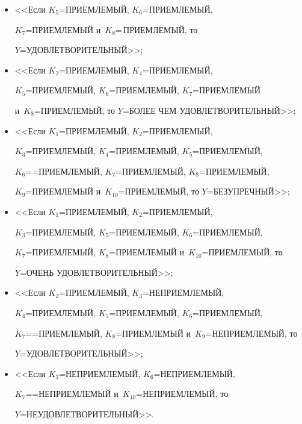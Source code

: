 \begin{itemize} 

\item[$e_1$:] <<Если $K_5$\;=\;ПРИ\-ЕМ\-ЛЕ\-МЫЙ, $K_6$\;=\;ПРИ\-ЕМ\-ЛЕ\-МЫЙ, 

$K_7$\;=\;ПРИ\-ЕМ\-ЛЕ\-МЫЙ и~$K_8$\;=\,ПРИ\-ЕМ\-ЛЕ\-МЫЙ, то 

$Y$\;=\;УДОВЛЕ\-ТВО\-РИ\-ТЕЛЬ\-НЫЙ>>; 

  

\item[$e_2$:] <<Если $K_2$\;=\;ПРИ\-ЕМ\-ЛЕ\-МЫЙ, $K_4$\;=\;ПРИ\-ЕМ\-ЛЕ\-МЫЙ, 

$K_5$\;=\;ПРИ\-ЕМ\-ЛЕ\-МЫЙ, $K_6$\;=\;ПРИ\-ЕМ\-ЛЕ\-МЫЙ, $K_7$\;=\;ПРИ\-ЕМ\-ЛЕ\-МЫЙ 

и~$K_8$\;=\;ПРИ\-ЕМ\-ЛЕ\-МЫЙ, то $Y$\;=\;БО\-ЛЕЕ ЧЕМ УДОВЛЕ\-ТВО\-РИ\-ТЕЛЬ\-НЫЙ>>; 

  

\item[$e_3$:] <<Если $K_1$\;=\;ПРИ\-ЕМ\-ЛЕ\-МЫЙ, $K_2$\;=\;ПРИ\-ЕМ\-ЛЕ\-МЫЙ, 

$K_3$\;=\;ПРИ\-ЕМЛЕ\-МЫЙ, $K_4$\;=\;ПРИ\-ЕМ\-ЛЕ\-МЫЙ, $K_5$\;=\;ПРИ\-ЕМ\-ЛЕ\-МЫЙ, 

$K_6$\;=\linebreak =\;ПРИ\-ЕМ\-ЛЕ\-МЫЙ, $K_7$\;=\;ПРИ\-ЕМ\-ЛЕ\-МЫЙ, $K_8$\;=\;ПРИ\-ЕМ\-ЛЕ\-МЫЙ, 

$K_9$\;=\;ПРИ\-ЕМ\-ЛЕ\-МЫЙ и~$K_{10}$\;=\;ПРИ\-ЕМ\-ЛЕ\-МЫЙ, то $Y$\;=\;БЕЗ\-УПРЕЧ\-НЫЙ>>; 

  

\item[$e_4$:] <<Если $K_1$\;=\;ПРИ\-ЕМ\-ЛЕ\-МЫЙ, $K_2$\;=\;ПРИ\-ЕМ\-ЛЕ\-МЫЙ, 

$K_3$\;=\;ПРИ\-ЕМ\-ЛЕ\-МЫЙ, $K_5$\;=\;ПРИ\-ЕМ\-ЛЕ\-МЫЙ, $K_6$\;=\;ПРИ\-ЕМ\-ЛЕ\-МЫЙ, 

$K_7$\;=\;ПРИ\-ЕМ\-ЛЕ\-МЫЙ, $K_8$\;=\;ПРИ\-ЕМ\-ЛЕ\-МЫЙ и~$K_{10}$\;=\;ПРИ\-ЕМ\-ЛЕ\-МЫЙ, то 

$Y$\;=\;ОЧЕНЬ УДОВЛЕ\-ТВО\-РИ\-ТЕЛЬ\-НЫЙ>>; 

  

\item[$e_5$:] <<Если $K_2$\;=\;ПРИЕМЛЕМЫЙ, $K_3$\;=\;НЕ\-ПРИ\-ЕМ\-ЛЕ\-МЫЙ, 

$K_4$\;=\;ПРИ\-ЕМ\-ЛЕ\-МЫЙ, $K_5$\;=\;ПРИ\-ЕМ\-ЛЕ\-МЫЙ, $K_6$\;=\;ПРИ\-ЕМ\-ЛЕ\-МЫЙ,  

$K_7$\;=\linebreak =\;ПРИ\-ЕМ\-ЛЕ\-МЫЙ, $K_8$\;=\;ПРИ\-ЕМ\-ЛЕ\-МЫЙ и~$K_9$\;=\;НЕ\-ПРИ\-ЕМ\-ЛЕ\-МЫЙ, то 

$Y$\;=\;УДОВЛЕ\-ТВО\-РИ\-ТЕЛЬ\-НЫЙ>>; 

  

\item[$e_6$:] <<Если $K_3$\;=\;НЕПРИЕМЛЕМЫЙ, $K_6$\;=\;НЕ\-ПРИ\-ЕМ\-ЛЕ\-МЫЙ, 

$K_7$\;=\linebreak =\;НЕ\-ПРИ\-ЕМ\-ЛЕ\-МЫЙ и~$K_{10}$\;=\;НЕ\-ПРИ\-ЕМ\-ЛЕ\-МЫЙ, то 

$Y$\;=\;НЕ\-УДОВЛЕ\-ТВО\-РИ\-ТЕЛЬ\-НЫЙ>>.

\end{itemize}

